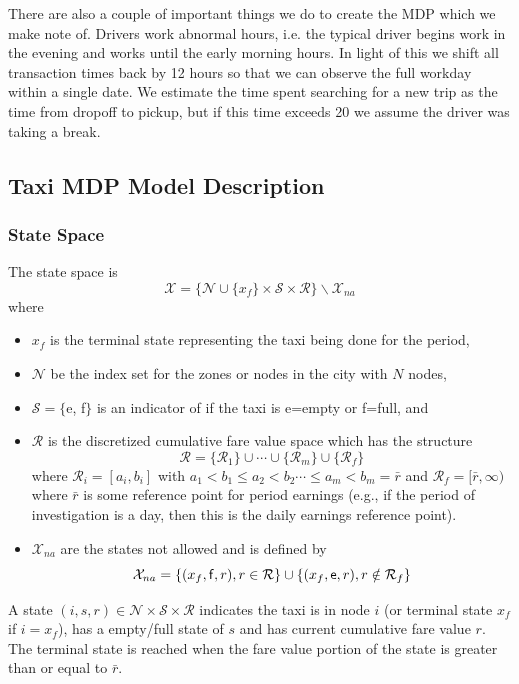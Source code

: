 \documentclass{article}
\newcommand{\mc}{\mathcal}
\newcommand{\e}{{\sf e}}
\newcommand{\f}{{\sf f}}
\begin{document}
There are also a couple of important things we do to create the MDP which we make note of. Drivers work abnormal hours, i.e. the typical driver begins work in the evening and works until the early morning hours. In light of this we shift all transaction times back by 12 hours so that we can observe the full workday within a single date. We estimate the time spent searching for a new trip as the time from dropoff to pickup, but if this time exceeds 20 we assume the driver was taking a break.

\subsection{Taxi MDP Model Description}\label{mdp}
\subsubsection{State Space}
The state space is
\[\mc{X}=\{\mc{N}\cup\{x_f\}\times\mc{S}\times \mc{R}\}\backslash \mc{X}_{na}\]
where
\begin{itemize}
\item $x_f$ is the terminal state representing the taxi being done for the period,

\item $\mc{N}$ be the index set for the zones or nodes in the city with $N$ nodes,

\item $\mc{S}=\{${\e, \f}$\}$ is an indicator of if the taxi is \e=empty or \f=full, and

\item $\mc{R}$ is the discretized cumulative fare value space which has the
structure \[\mc{R}=\{\mc{R}_1\}\cup\cdots\cup\{\mc{R}_m\}\cup\{\mc{R}_f\}\]
where $\mc{R}_i=[a_i,b_i]$ with $a_1< b_1\leq a_2<b_2 \cdots \leq a_m<
b_m=\bar{r}$ and $\mc{R}_f=[\bar{r}, \infty)$ where $\bar{r}$ is some reference point for period earnings (e.g., if the period of investigation is a day, then this is the daily earnings reference point).

\item $\mc{X}_{na}$ are the states not allowed and is defined by
\[\mc{X}_{na}=\{(x_f,\f,r), r\in \mc{R}\}\cup\{(x_f,\e,r), r\notin\mc{R}_f\}\]
\end{itemize}
   
A state $(i,s,r)\in \mc{N}\times\mc{S}\times \mc{R}$ indicates the taxi
is in node $i$ (or terminal state $x_f$ if $i=x_f$), has a empty/full state of $s$ and has current cumulative
fare value $r$. The terminal state is reached when the fare value portion of the
state is greater than or equal to $\bar{r}$. 
\end{document}

